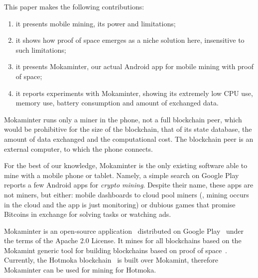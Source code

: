 This paper makes the following contributions:
%
\begin{enumerate}
\item it presents mobile mining, its power and limitations;
\item it shows how proof of space emerges as a niche solution here, insensitive
  to such limitations;
\item it presents Mokaminter, our actual Android app for mobile mining with proof of space;
\item it reports experiments with Mokaminter, showing its extremely low
  CPU use, memory use, battery consumption and amount of exchanged data.
\end{enumerate}

Mokaminter runs only a miner in the phone, not a full blockchain
peer, which would be prohibitive for the size of the blockchain,
that of its state database, the amount of data exchanged and the computational
cost. The blockchain peer is an external computer, to which the phone connects.

For the best of our knowledge, Mokaminter is the only existing software able
to mine with a mobile phone or tablet. Namely,
a simple search on Google Play reports a few Android apps for
\emph{crypto mining}. Despite their name, these apps are not miners, but either:
mobile dashboards to cloud pool miners (\ie{}, mining occurs in the cloud and
the app is just monitoring)
or dubious games that promise Bitcoins in exchange for solving tasks
or watching ads.

Mokaminter is an open-source application~\cite{mokaminter-source-code}
distributed on Google Play~\cite{mokaminter-google-play}
under the terms of the Apache 2.0 License. It mines for all
blockchains based on the Mokamint generic tool for building
blockchains based on proof of space~\cite{mokamint-source-code}. Currently,
the Hotmoka blockchain~\cite{hotmoka} is
built over Mokamint, therefore Mokaminter can be used for mining for Hotmoka.
